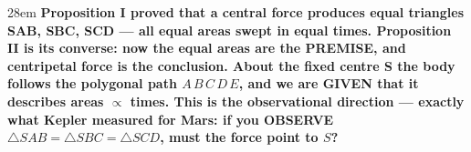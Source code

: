 \documentclass[border=4pt]{standalone}
\begin{document}
\begin{varwidth}{28em}
\large\bfseries
Proposition I proved that a central force produces \textcolor{fanpurple}{equal triangles SAB, SBC, SCD — all equal areas} swept in equal times. Proposition II is its converse: now the equal areas are the PREMISE, and centripetal force is the conclusion. About the fixed \textcolor{centerorange}{centre S} the body follows the polygonal path $A\,B\,C\,D\,E$, and we are GIVEN that it describes areas $\propto$ times. This is the observational direction — exactly what Kepler measured for Mars: if you OBSERVE $\triangle SAB=\triangle SBC=\triangle SCD$, must the force point to $S$?
\end{varwidth}
\end{document}
